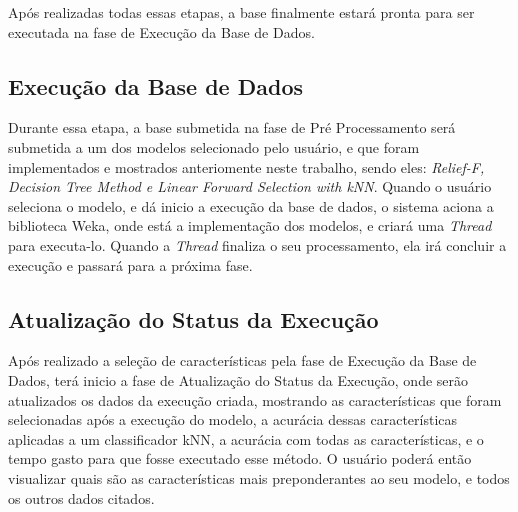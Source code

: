 Após realizadas todas essas etapas, a base finalmente estará pronta para ser executada na fase de Execução da Base de Dados.


\subsection{Execução da Base de Dados}
Durante essa etapa, a base submetida na fase de Pré Processamento será submetida a um dos modelos selecionado pelo usuário, e que foram implementados e mostrados anteriomente neste trabalho, sendo eles: \textit{Relief-F, Decision Tree Method e Linear Forward Selection with kNN}. Quando o usuário seleciona o modelo, e dá inicio a execução da base de dados, o sistema aciona a biblioteca Weka, onde está a implementação dos modelos, e criará uma \textit{Thread} para executa-lo. Quando a \textit{Thread} finaliza o seu processamento, ela irá concluir a execução e passará para a próxima fase.

\subsection{Atualização do Status da Execução}
Após realizado a seleção de características pela fase de Execução da Base de Dados, terá inicio a fase de Atualização do Status da Execução, onde serão atualizados os dados da execução criada, mostrando as características que foram selecionadas após a execução do modelo, a acurácia dessas características aplicadas a um classificador kNN, a acurácia com todas as características, e o tempo gasto para que fosse executado esse método. O usuário poderá então visualizar quais são as características mais preponderantes ao seu modelo, e todos os outros dados citados.